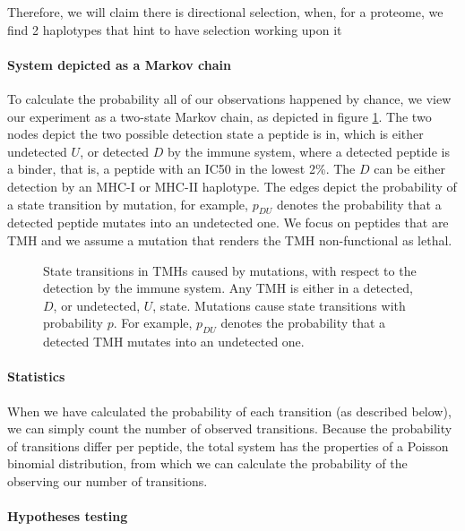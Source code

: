 Therefore, we will claim there is directional selection, 
when, for a proteome, we find 2 haplotypes 
that hint to have selection working upon it

\paragraph{System depicted as a Markov chain}
 
To calculate the probability all of our observations happened by chance,
we view our experiment as a two-state Markov chain, as depicted in
figure \ref{fig:markov_chain}. The two nodes depict the
two possible detection state a peptide is in, which is
either undetected $U$, or detected $D$ by the immune system,
where a detected peptide is a binder, that is, 
a peptide with an IC50 in the lowest 2\%.
The $D$ can be either detection by an MHC-I or MHC-II haplotype.
The edges depict the probability of a state transition by mutation,
for example, $p_{DU}$ denotes the probability that a detected
peptide mutates into an undetected one.
We focus on peptides that are TMH and we assume a mutation that 
renders the TMH non-functional as lethal.

\begin{figure}
  \centering
  
  \caption{
    State transitions in TMHs caused by mutations, with respect to the
    detection by the immune system. Any TMH is either in a detected, $D$, or
    undetected, $U$, state. Mutations cause state transitions with probability
    $p$. For example, $p_{DU}$ denotes the probability that a detected
    TMH mutates into an undetected one.
  }
  \label{fig:markov_chain}
\end{figure}

\paragraph{Statistics}

When we have calculated the probability of each transition (as described below),
we can simply count the number of observed transitions.
Because the probability of transitions differ per peptide,
the total system has the properties of a Poisson binomial distribution,
from which we can calculate the probability of the observing our
number of transitions.

\paragraph{Hypotheses testing}

